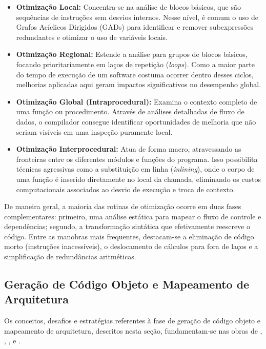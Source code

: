 \begin{itemize}
    \item \textbf{Otimização Local:} Concentra-se na análise de blocos básicos, que são sequências de instruções sem desvios internos. Nesse nível, é comum o uso de Grafos Acíclicos Dirigidos (GADs) para identificar e remover subexpressões redundantes e otimizar o uso de variáveis locais.
    
    \item \textbf{Otimização Regional:} Estende a análise para grupos de blocos básicos, focando prioritariamente em laços de repetição (\textit{loops}). Como a maior parte do tempo de execução de um software costuma ocorrer dentro desses ciclos, melhorias aplicadas aqui geram impactos significativos no desempenho global.
    
    \item \textbf{Otimização Global (Intraprocedural):} Examina o contexto completo de uma função ou procedimento. Através de análises detalhadas de fluxo de dados, o compilador consegue identificar oportunidades de melhoria que não seriam visíveis em uma inspeção puramente local.
    
    \item \textbf{Otimização Interprocedural:} Atua de forma macro, atravessando as fronteiras entre os diferentes módulos e funções do programa. Isso possibilita técnicas agressivas como a substituição em linha (\textit{inlining}), onde o corpo de uma função é inserido diretamente no local da chamada, eliminando os custos computacionais associados ao desvio de execução e troca de contexto.
\end{itemize}

De maneira geral, a maioria das rotinas de otimização ocorre em duas fases complementares: primeiro, uma análise estática para mapear o fluxo de controle e dependências; segundo, a transformação sintática que efetivamente reescreve o código. Entre as manobras mais frequentes, destacam-se a eliminação de código morto (instruções inacessíveis), o deslocamento de cálculos para fora de laços e a simplificação de redundâncias aritméticas.

\subsection{Geração de Código Objeto e Mapeamento de Arquitetura}

Os conceitos, desafios e estratégias referentes à fase de geração de código objeto e mapeamento de arquitetura, descritos nesta seção, fundamentam-se nas obras de , , ,  e .

